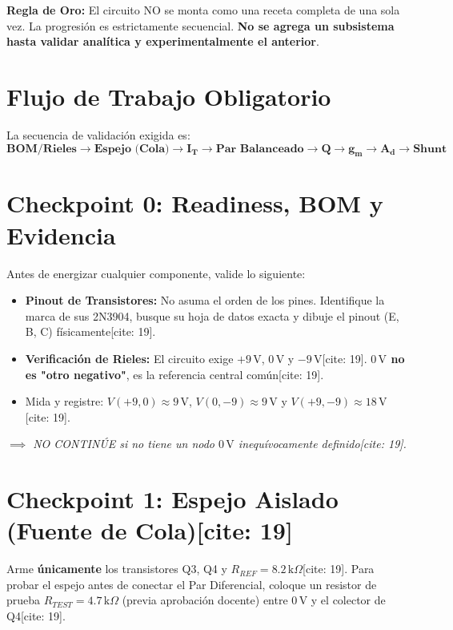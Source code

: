 \documentclass[11pt, a4paper]{article}
\begin{document}
\begin{tcolorbox}[colback=ucbblue!5, colframe=ucbblue, title=\textbf{Guía de Laboratorio Estructurada: Hito 2 (Sesión 1)}]
    \textbf{Regla de Oro:} El circuito NO se monta como una receta completa de una sola vez. La progresión es estrictamente secuencial. \textbf{No se agrega un subsistema hasta validar analítica y experimentalmente el anterior}.
\end{tcolorbox}

\section*{Flujo de Trabajo Obligatorio}
La secuencia de validación exigida es:
\begin{equation*}
    \mathbf{\text{BOM/Rieles} \to \text{Espejo (Cola)} \to I_T \to \text{Par Balanceado} \to Q \to g_m \to A_d \to \text{Shunt}}
\end{equation*}

\section*{Checkpoint 0: Readiness, BOM y Evidencia}
Antes de energizar cualquier componente, valide lo siguiente:
\begin{itemize}
    \item \textbf{Pinout de Transistores:} No asuma el orden de los pines. Identifique la marca de sus 2N3904, busque su hoja de datos exacta y dibuje el pinout (E, B, C) físicamente[cite: 19].
    \item \textbf{Verificación de Rieles:} El circuito exige $+9\,\text{V}$, $0\,\text{V}$ y $-9\,\text{V}$[cite: 19]. \textbf{$0\,\text{V}$ no es "otro negativo"}, es la referencia central común[cite: 19].
    \item Mida y registre: $V(+9,0) \approx 9\,\text{V}$, $V(0,-9) \approx 9\,\text{V}$ y $V(+9,-9) \approx 18\,\text{V}$[cite: 19].
\end{itemize}
\textit{$\implies$ NO CONTINÚE si no tiene un nodo $0\,\text{V}$ inequívocamente definido[cite: 19].}

\section*{Checkpoint 1: Espejo Aislado (Fuente de Cola)[cite: 19]}
Arme \textbf{únicamente} los transistores Q3, Q4 y $R_{REF} = 8.2\,\text{k}\Omega$[cite: 19].
Para probar el espejo antes de conectar el Par Diferencial, coloque un resistor de prueba $R_{TEST} = 4.7\,\text{k}\Omega$ (previa aprobación docente) entre $0\,\text{V}$ y el colector de Q4[cite: 19].
\end{document}
